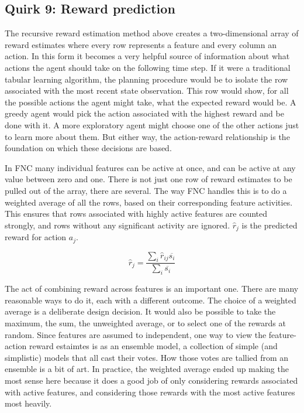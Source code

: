 \subsection*{Quirk 9: Reward prediction}
\label{algoreward prediction}

The recursive reward estimation method above creates a two-dimensional array
of reward estimates where every row represents a feature and every column
an action. In this form it becomes a very helpful source of information
about what actions the agent should take on the following time step.
If it were a traditional tabular learning algorithm, the planning procedure would
be to isolate the row associated with the most recent state observation.
This row would show, for all the possible actions the agent might take,
what the expected reward would be. A greedy agent would pick the action
associated with the highest reward and be done with it. A more exploratory
agent might choose one of the other actions just to learn more about them.
But either way, the action-reward relationship is the foundation on which
these decisions are based.

In FNC many individual features can be active at once, and can be active
at any value between zero and one. There is not just one row of reward
estimates to be pulled out of the array, there are several. The way 
FNC handles this is to do a weighted average of all the rows, based on
their corresponding feature activities. This ensures that rows associated
with highly active features are counted strongly, and rows without 
any significant activity are ignored. $\hat{r}_j$ is the predicted reward for
action $a_j$.

\begin{equation}
\hat{r}_{j} = \frac{\sum_i \hat{r}_{ij} \overline{s_i}}
{\sum_i \overline{s_i}}
\end{equation}

The act of combining reward across features is an important one.
There are many reasonable ways to do it, each with a different outcome.
The choice of a weighted average is a deliberate design decision.
It would also be possible to take the maximum, the sum, the unweighted
average, or to select one of the rewards at random.
Since features are assumed to independent, one way to view the
feature-action reward estaimtes is as an ensemble model, a collection
of simple (and simplistic) models that all cast their votes. How those
votes are tallied from an ensemble is a bit of art. In practice, the
weighted average ended up making the most sense here because it does a good
job of only considering rewards associated with active features, and considering
those rewards with the most active features most heavily.

